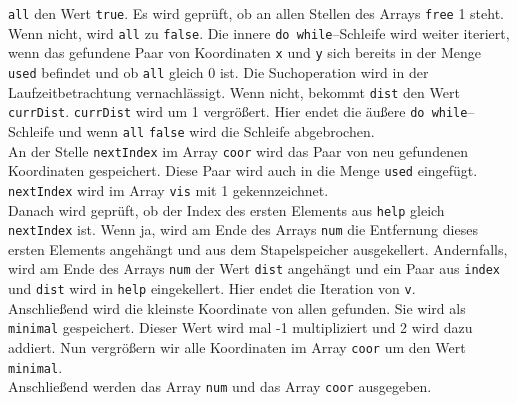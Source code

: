 \documentclass[a4paper,10pt,ngerman]{scrartcl}
\begin{document}
\texttt{all} den Wert \texttt{true}. Es wird geprüft, ob an allen Stellen des Arrays \texttt{free} 1 steht.
Wenn nicht, wird \texttt{all} zu \texttt{false}. Die innere \texttt{do while}--Schleife wird
weiter iteriert, wenn das gefundene Paar von Koordinaten \texttt{x} und \texttt{y} sich bereits
in der Menge \texttt{used} befindet und ob \texttt{all} gleich 0 ist. Die Suchoperation wird in der Laufzeitbetrachtung vernachlässigt.
Wenn nicht, bekommt \texttt{dist} den Wert \texttt{currDist}. \texttt{currDist} wird um 1 vergrößert.
Hier endet die äußere \texttt{do while}--Schleife und wenn \texttt{all} \texttt{false} wird die Schleife abgebrochen.\\
An der Stelle \texttt{nextIndex} im Array \texttt{coor} wird das Paar von neu gefundenen Koordinaten gespeichert.
Diese Paar wird auch in die Menge \texttt{used} eingefügt. \texttt{nextIndex} wird im Array \texttt{vis} mit 1 gekennzeichnet.\\
Danach wird geprüft, ob der Index des ersten Elements aus \texttt{help} gleich \texttt{nextIndex} ist.
Wenn ja, wird am Ende des Arrays \texttt{num} die Entfernung dieses ersten Elements angehängt und aus dem Stapelspeicher ausgekellert.
Andernfalls, wird am Ende des Arrays \texttt{num} der Wert \texttt{dist} angehängt und ein Paar aus \texttt{index} und
\texttt{dist} wird in \texttt{help} eingekellert. Hier endet die Iteration von \texttt{v}.\\
Anschließend wird die kleinste Koordinate von allen gefunden. Sie wird als \texttt{minimal} gespeichert.
Dieser Wert wird mal -1 multipliziert und 2 wird dazu addiert. 
Nun vergrößern wir alle Koordinaten im Array \texttt{coor} um den Wert \texttt{minimal}.\\
Anschließend werden das Array \texttt{num} und das Array \texttt{coor} ausgegeben.\\
\end{document}
